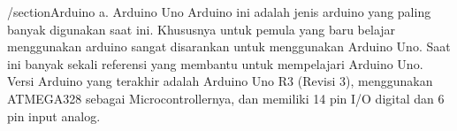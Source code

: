 /section{Arduino}
a. Arduino Uno
 Arduino ini adalah jenis arduino yang paling banyak digunakan saat ini. Khususnya untuk pemula yang baru belajar menggunakan arduino sangat disarankan untuk menggunakan Arduino Uno. Saat ini banyak sekali referensi yang membantu untuk mempelajari Arduino Uno. Versi Arduino yang terakhir adalah Arduino Uno R3 (Revisi 3), menggunakan ATMEGA328 sebagai Microcontrollernya, dan memiliki 14 pin I/O digital dan 6 pin input analog.
